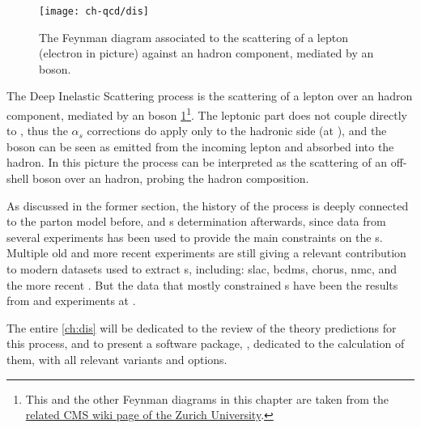 
\begin{figure}
	\centering
	\texttt{[image: ch-qcd/dis]}
	\caption{
		The \lo Feynman diagram associated to the scattering of a lepton (electron
		in picture) against an hadron component, mediated by an \ew boson.
	}
	\label{fig:qcd/dis}
\end{figure}


The Deep Inelastic Scattering process is the scattering of a lepton over an
hadron component, mediated by an \ew boson \cref{fig:qcd/dis}\footnote{
	This and the other Feynman diagrams in this chapter are taken from the
	\href{https://wiki.physik.uzh.ch/cms/latex:feynman}{related CMS wiki page
		of the Zurich University}.
}.
%
The leptonic part does not couple directly to \qcd , thus the $\alpha_s$
corrections do apply only to the hadronic side (at \lo \ew), and the \ew boson
can be seen as emitted from the incoming lepton and absorbed into the hadron.
%
In this picture the process can be interpreted as the scattering of an
off-shell \ew boson over an hadron, probing the hadron composition.

As discussed in the former section, the history of the \dis process is deeply
connected to the parton model before, and \pdf{}s determination afterwards,
since data from several \dis experiments has been used to provide the main
constraints on the \pdf{}s.
%
Multiple old and more recent \dis experiments are still giving a relevant
contribution to modern datasets used to extract \pdf{}s, including:
\acrfull{slac}, \acrfull{bcdms}, \acrfull{chorus}, \acrfull{nmc}, and the more
recent \nutev.
%
But the \dis data that mostly constrained \pdf{}s have been the results from
\hone and \zeus experiments at \hera.

The entire \cref{ch:dis} will be dedicated to the review of the theory
predictions for this process, and to present a software package, \yadism,
dedicated to the calculation of them, with all relevant variants and options.
